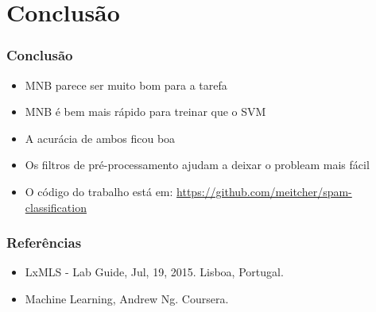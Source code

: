 \documentclass[10pt]{beamer}
\begin{document}
\section{Conclusão}

\begin{frame}[fragile]
  \frametitle{Conclusão}

  \begin{itemize}

    \item MNB parece ser muito bom para a tarefa

    \item MNB é bem mais rápido para treinar que o SVM

    \item A acurácia de ambos ficou boa

    \item Os filtros de pré-processamento ajudam a deixar o probleam mais fácil

    \item O código do trabalho está em: \url{https://github.com/meitcher/spam-classification}

  \end{itemize}

\end{frame}




\begin{frame}[fragile]
  \frametitle{Referências}

  \begin{itemize}

    \item LxMLS - Lab Guide, Jul, 19, 2015. Lisboa, Portugal.

  \item Machine Learning, Andrew Ng. Coursera.
  \end{itemize}
\end{frame}




\end{document}
